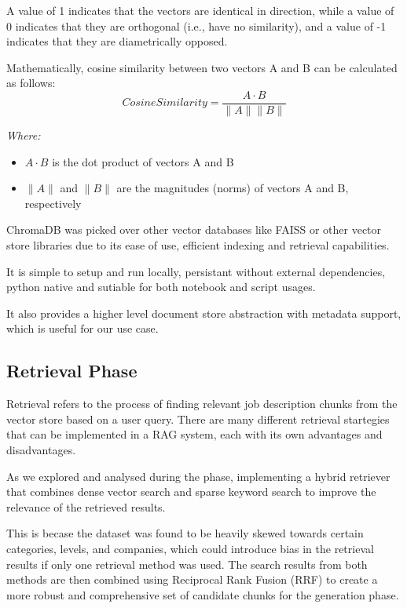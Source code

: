 ﻿\documentclass{article}
\renewcommand{\text}[1]{\mathit{#1}}
\begin{document}
A value of 1 indicates that the vectors are identical in direction, while a value of 0 indicates that they are orthogonal (i.e., have no similarity), and a value of
-1 indicates that they are diametrically opposed.

Mathematically, cosine similarity between two vectors A and B can be calculated as follows:
\begin{equation}
\text{Cosine Similarity} = \frac{A \cdot B}{\|A\| \|B\|}
\end{equation}

\textit{Where: \\}
\begin{itemize}
	\item $A \cdot B$ is the dot product of vectors A and B
	\item $\|A\|$ and $\|B\|$ are the magnitudes (norms) of vectors A and B, respectively
\end{itemize}

ChromaDB was picked over other vector databases like FAISS or other vector store libraries due to its ease of use, efficient indexing and retrieval capabilities.

It is simple to setup and run locally, persistant without external dependencies, python native and sutiable for both notebook and script usages.

It also provides a higher level document store abstraction with metadata support, which is useful for our use case.

\subsection{Retrieval Phase}

Retrieval refers to the process of finding relevant job description chunks from the vector store based on a user query.
There are many different retrieval startegies that can be implemented in a RAG system, each with its own advantages and disadvantages.

As we explored and analysed during the phase, implementing a hybrid retriever that combines dense vector search and sparse keyword search to improve the relevance of the retrieved results.

This is becase the dataset was found to be heavily skewed towards certain categories, levels, and companies, which could introduce bias in the retrieval results if only one retrieval method was used.
The search results from both methods are then combined using Reciprocal Rank Fusion (RRF) to create a more robust and comprehensive set of candidate chunks for the generation phase.
\end{document}
